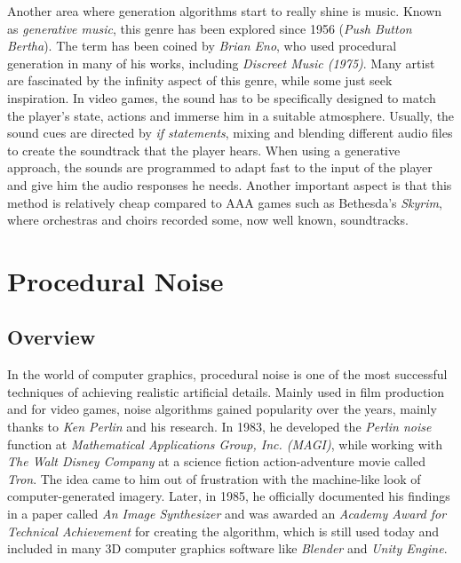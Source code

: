 Another area where generation algorithms start to really shine is music. Known as \textit{generative music}, this genre has been explored since 1956 (\textit{Push Button Bertha}). The term has been coined by \textit{Brian Eno}, who used procedural generation in many of his works, including \textit{Discreet Music (1975)}. Many artist are fascinated by the infinity aspect of this genre, while some just seek inspiration. In video games, the sound has to be specifically designed to match the player's state, actions and immerse him in a suitable atmosphere. Usually, the sound cues are directed by \textit{if statements}, mixing and blending different audio files to create the soundtrack that the player hears. When using a generative approach, the sounds are programmed to adapt fast to the input of the player and give him the audio responses he needs. Another important aspect is that this method is relatively cheap compared to AAA games such as Bethesda's \textit{Skyrim}, where orchestras and choirs recorded some, now well known, soundtracks\cite{collins2009introduction}.

\section{Procedural Noise}

\subsection{Overview}

In the world of computer graphics, procedural noise is one of the most successful techniques of achieving realistic artificial details. Mainly used in film production and for video games, noise algorithms gained popularity over the years, mainly thanks to \textit{Ken Perlin} and his research. In 1983, he developed the \textit{Perlin noise} function at \textit{Mathematical Applications Group, Inc. (MAGI)}, while working with \textit{The Walt Disney Company} at a science fiction action-adventure movie called \textit{Tron}. The idea came to him out of frustration with the machine-like look of computer-generated imagery\cite{perlinnoisewiki}. Later, in 1985, he officially documented his findings in a paper called \textit{An Image Synthesizer}\cite{perlin1985image} and was awarded an \textit{Academy Award for Technical Achievement} for creating the algorithm, which is still used today and included in many 3D computer graphics software like \textit{Blender} and \textit{Unity Engine}.\\

